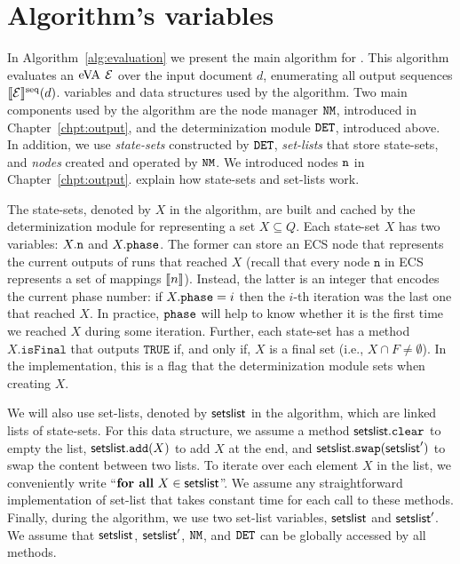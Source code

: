 \section{Algorithm's variables}
In Algorithm~\ref{alg:evaluation} we present the main algorithm for \rematch.
This algorithm evaluates an $\mathrm{eVA}$ $\mathcal{E}$ over the input document $d$,
enumerating all output sequences $\llbracket\mathcal{E}\rrbracket^{\operatorname{seq}}(d)$. %
variables and data structures used by the algorithm.
%
Two main components used by the algorithm are the node manager $\mathtt{NM}$, introduced
in Chapter~\ref{chpt:output}, and the determinization module $\mathtt{DET}$, introduced
above. In addition, we use \emph{state-sets} constructed by $\mathtt{DET}$,
\emph{set-lists} that store state-sets, and \emph{nodes} created and operated by
$\mathtt{NM}$. We introduced nodes $\mathtt{n}$ in Chapter~\ref{chpt:output}. %
explain how state-sets and set-lists work.


The state-sets, denoted by $X$ in the algorithm, are built and cached by the
determinization module for representing a set $X \subseteq Q$. Each state-set
$X$ has two variables: $X.\mathtt{n}$ and $X.\texttt{phase}$. The former can store an ECS
node that represents the current outputs of runs that reached $X$ (recall that
every node $\texttt{n}$ in ECS represents a set of mappings $\llbracket n\rrbracket$). Instead,
the latter is an integer that encodes the current phase number: if $X.\texttt{phase} =
i$ then the $i$-th iteration was the last one that reached $X$. In practice,
$\texttt{phase}$ will help to know whether it is the first time we reached $X$ during
some iteration. Further, each state-set has a method $X.\texttt{isFinal}$ that
outputs $\texttt{TRUE}$ if, and only if, $X$ is a final set (i.e., $X \cap F
\neq \emptyset$). In the implementation, this is a flag that the determinization
module sets when creating $X$.

We will also use set-lists, denoted by $\textsf{setslist}$ in the algorithm, which
are linked lists of state-sets. For this data structure, we assume a method
$\textsf{setslist}.\texttt{clear}$ to empty the list,
$\textsf{setslist}.\texttt{add}(X)$ to add $X$ at the end, and
$\textsf{setslist}.\texttt{swap}(\textsf{setslist}')$ to swap the content between two
lists. To iterate over each element $X$ in the list, we conveniently write
``$\textbf{for all} \ X \in \textsf{setslist}$''. We assume any straightforward
implementation of set-list that takes constant time for each call to these
methods. Finally, during the algorithm, we use two set-list variables,
$\textsf{setslist}$ and $\textsf{setslist}'$. We assume that $\textsf{setslist}$,
$\textsf{setslist}'$, $\mathtt{NM}$, and $\mathtt{DET}$ can be globally accessed by all methods.


